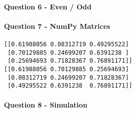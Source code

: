 \paragraph{Question 6 - Even / Odd}\label{question-6---even-odd}

\begin{Shaded}
\begin{Highlighting}[]
\NormalTok{) }\OperatorTok{{-}\textgreater{}} \NormalTok{:}
      \OperatorTok{\%}   
\end{Highlighting}
\end{Shaded}

\paragraph{Question 7 - NumPy
Matrices}\label{question-7---numpy-matrices}

\begin{Shaded}
\begin{Highlighting}[]
\OperatorTok{=}\NormalTok{, }\NormalTok{)}
\OperatorTok{=}
\end{Highlighting}
\end{Shaded}

\begin{verbatim}
[[0.61988056 0.08312719 0.49295522]
 [0.70129885 0.24699207 0.6391238 ]
 [0.25694693 0.71828367 0.76891171]]
[[0.61988056 0.70129885 0.25694693]
 [0.08312719 0.24699207 0.71828367]
 [0.49295522 0.6391238  0.76891171]]
\end{verbatim}

\paragraph{Question 8 - Simulation}\label{question-8---simulation}

